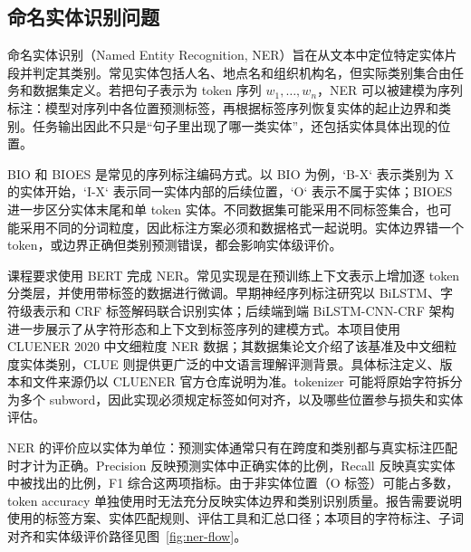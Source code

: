 \documentclass[UTF8,a4paper,12pt,fontset=none]{ctexart}
\begin{document}
\subsection{命名实体识别问题}
命名实体识别（Named Entity Recognition, NER）旨在从文本中定位特定实体片段并判定其类别。常见实体包括人名、地点名和组织机构名，但实际类别集合由任务和数据集定义。若把句子表示为 token 序列 $w_1,\ldots,w_n$，NER 可以被建模为序列标注：模型对序列中各位置预测标签，再根据标签序列恢复实体的起止边界和类别。任务输出因此不只是“句子里出现了哪一类实体”，还包括实体具体出现的位置。

BIO 和 BIOES 是常见的序列标注编码方式。以 BIO 为例，`B-X` 表示类别为 X 的实体开始，`I-X` 表示同一实体内部的后续位置，`O` 表示不属于实体；BIOES 进一步区分实体末尾和单 token 实体。不同数据集可能采用不同标签集合，也可能采用不同的分词粒度，因此标注方案必须和数据格式一起说明。实体边界错一个 token，或边界正确但类别预测错误，都会影响实体级评价。

课程要求使用 BERT 完成 NER。常见实现是在预训练上下文表示上增加逐 token 分类层，并使用带标签的数据进行微调\cite{bert}。早期神经序列标注研究以 BiLSTM、字符级表示和 CRF 标签解码联合识别实体；后续端到端 BiLSTM-CNN-CRF 架构进一步展示了从字符形态和上下文到标签序列的建模方式\cite{lample,mah_hovy}。本项目使用 CLUENER 2020 中文细粒度 NER 数据；其数据集论文介绍了该基准及中文细粒度实体类别，CLUE 则提供更广泛的中文语言理解评测背景。具体标注定义、版本和文件来源仍以 CLUENER 官方仓库说明为准\cite{cluener2020,clue,cluener_data}。tokenizer 可能将原始字符拆分为多个 subword，因此实现必须规定标签如何对齐，以及哪些位置参与损失和实体评估。

NER 的评价应以实体为单位：预测实体通常只有在跨度和类别都与真实标注匹配时才计为正确。Precision 反映预测实体中正确实体的比例，Recall 反映真实实体中被找出的比例，F1 综合这两项指标。由于非实体位置（O 标签）可能占多数，token accuracy 单独使用时无法充分反映实体边界和类别识别质量。报告需要说明使用的标签方案、实体匹配规则、评估工具和汇总口径；本项目的字符标注、子词对齐和实体级评价路径见图~\ref{fig:ner-flow}。
\end{document}
